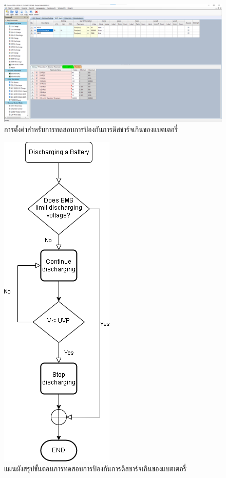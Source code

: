 \begin{center}
	\begin{figure}[H]
		\includegraphics[width=1\linewidth]{Chapters/img/R136_DEMO/UUT_TEST_OVDCP.png}
		\centering
		\captionsetup{justification=centering,margin=2cm}
		\caption{การตั้งค่าสำหรับการทดสอบการป้องกันการดิสชาร์จเกินของแบตเตอรี่}
		\label{fig:setting_discharge}
	\end{figure}
	\begin{figure}[H]
		\includegraphics[width=0.25\linewidth]{Chapters/img/R136_DEMO/Discharging_flow_chart.png}
		\centering
		\captionsetup{justification=centering,margin=2cm}
		\caption{แผนผังสรุปขั้นตอนการทดสอบการป้องกันการดิสชาร์จเกินของแบตเตอรี่}
	\end{figure}
\end{center}
